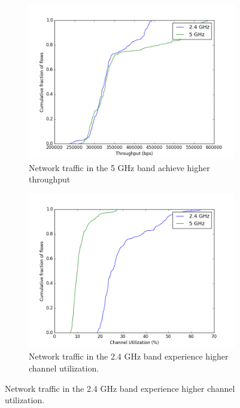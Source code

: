 \begin{figure}
\begin{subfigure}{0.5\textwidth}
\includegraphics[width=\linewidth]{figure/throughput(5g_vs_2g).png}
\caption{Network traffic in the 5 GHz band achieve higher throughput}
\label{fig:throughput}
\end{subfigure}
\hspace*{\fill} %
\begin{subfigure}{0.5\textwidth}
\includegraphics[width=\linewidth]{figure/channel_utilization(2g_vs_5g).png}
\caption{Network traffic in the 2.4 GHz band experience higher channel utilization.}
\label{fig:utilization}
\end{subfigure}

\end{figure}
